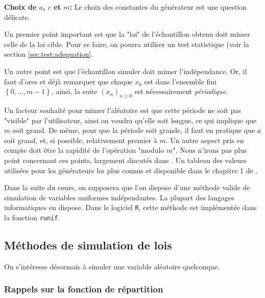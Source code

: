 \vspace{\baselineskip}
\textbf{Choix de $a$, $c$ et $m$:} Le choix des constantes du générateur est une question délicate. 

Un premier point important est que la "loi" de l'échantillon obtenu doit mimer celle de la loi cible. 
Pour ce faire, on pourra utiliser un test statistique (voir la section \ref{sec:test:adequation}.

Un autre point est que l'échantillon simuler doit mimer l'indépendance. 
Or, il faut d'ores et déjà remarquer que chaque $x_k$ est dans l'ensemble fini $\left\lbrace 0,\dots, m-1\right\rbrace$, ainsi, la suite $(x_n)_{n\geq 0}$ est nécessairement \textit{périodique}.

Un facteur souhaité pour mimer l'aléatoire est que cette période ne soit pas "visible" par l'utilisateur, ainsi on voudra qu'elle soit longue, ce qui implique que $m$ soit grand. De même, pour que la période soit grande, il faut en pratique que $a$ soit grand, et, si possible, relativement premier à $m$.
Un autre aspect pris en compte doit être la rapidité de l'opération "modulo $m$". 
Nous n'irons pas plus point concernant ces points, largement discutés dans \citep{knuth1997art}. 
Un tableau des valeurs utilisées pour les générateurs les plus connus et disponible dans le chapitre 1 de \citep{delyon2017simulation}.

\vspace{\baselineskip}
Dans la suite du cours, on supposera que l'on dispose d'une méthode valide de simulation de variables uniformes indépendantes. 
La plupart des langages informatiques en dispose. 
Dans le logiciel \texttt{R}, cette méthode est implémentée dans la fonction \texttt{runif}. 

\subsection{Méthodes de simulation de lois} 

On s'intéresse désormais à simuler une variable aléatoire quelconque.

\subsubsection{Rappels sur la fonction de répartition}

